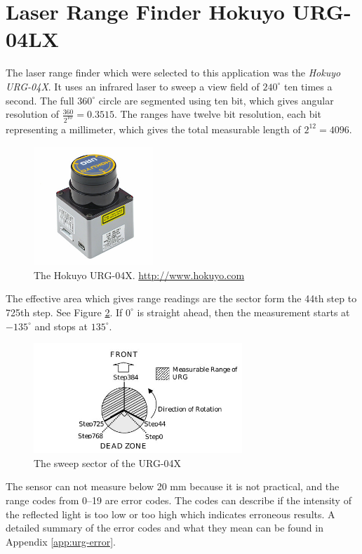 \section{Laser Range Finder Hokuyo URG-04LX}
\label{chap3:sec-urg}
The laser range finder which were selected to this application was the \emph{Hokuyo
URG-04X}. It uses an infrared laser to sweep a view field of $240^\circ$ ten times a
second. The full $360^\circ$ circle are segmented using ten bit, which gives angular
resolution of $\frac{360}{2^{10}} = 0.3515$. The ranges have twelve bit resolution, each
bit representing a millimeter, which gives the total measurable length of $2^{12} = 4096$.
\begin{figure}[htbp]
    \centering
    \includegraphics[width=0.4\textwidth]{pics/urg04lx}
    \caption{The Hokuyo URG-04X. \url{http://www.hokuyo.com}}
    \label{chap3:fig-urg}
\end{figure}
The effective area which gives range readings are the sector form the 44th step to
725th step. See Figure \ref{chap3:fig-urg-sector}. If $0^\circ$ is straight ahead, then
the measurement starts at $-135^\circ$ and stops at $135^\circ$. 
\begin{figure}[htbp]
    \centering
    \includegraphics[width=0.7\textwidth]{pics/urg-sector}
    \caption{The sweep sector of the URG-04X}
    \label{chap3:fig-urg-sector}
\end{figure}

The sensor can not measure below 20 mm because it is not practical, and the range codes
from 0--19 are error codes. The codes can describe if the intensity of the reflected light
is too low or too high which indicates erroneous results. A detailed summary of the
error codes and what they mean can be found in Appendix \ref{app:urg-error}.


